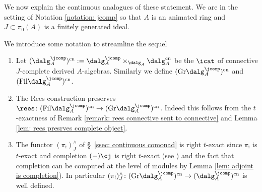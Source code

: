 \documentclass[10pt,reqno]{amsart}
\numberwithin{equation}{section}
\newcommand{\Gr}{\mathrm{Gr}}
\newcommand{\fil}{\mathrm{Fil}}
\newcommand{\cn}{\mathrm{cn}}
\newcommand{\pij}{(\pi_!)^\wedge_J}
\begin{document}
We now explain the continuous analogues of these statement. We are in the setting of Notation \ref{notation: jcomp} so that $A$ is an animated ring and $J\subset \pi_0(A)$ is a finitely generated ideal.

\begin{notation}\label{notation: complete fildalg cnnective} We introduce some notation to streamline the sequel
\begin{enumerate}
    \item      Let $(\dalg_A^\jcomp)^\cn:=\dalg^\jcomp_A\times_{\dalg_A}\dalg_A^\cn$ be the $\icat$ of connective $J$-complete derived $A$-algebras. Similarly we define $(\Gr\dalg_A^\jcomp)^\cn$ and  $(\fil\dalg_A^\jcomp)^\cn$.
    \item The Rees construction preserves $\rees\colon(\fil\dalg_A^\jcomp)^\cn\to (\Gr\dalg_A^\jcomp)^\cn$. Indeed this follows from the $t$-exactness of Remark \ref{remark: rees connective sent to connective} and Lemma \ref{lem: rees presrves complete object}. 
\item The functor $\pij$ of \S~\ref{ssec: continuous comonad} is right $t$-exact since $\pi_!$ is $t$-exact and completion $(-)\cj$ is right $t$-exact (see \cite[Remark 4.2.17]{Lur11}) and the fact that completion can be computed at the level of modules by Lemma \ref{lem: adjoint is completion}). In particular $\pij\colon (\Gr\dalg_A^\jcomp)^\cn\to (\dalg_A^\jcomp)^\cn$ is well defined.

\end{enumerate}
\end{notation}
\end{document}

